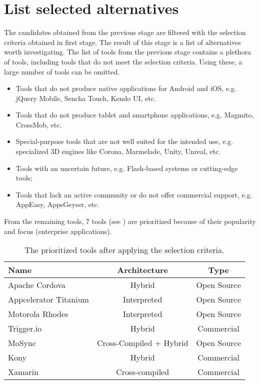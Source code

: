 \section{List selected alternatives}

The candidates obtained from the previous stage are filtered with the selection criteria obtained in first stage. The result of this stage is a list of alternatives worth investigating. The list of tools from the previous stage contains a plethora of tools, including tools that do not meet the selection criteria. Using these, a large number of tools can be omitted.

\begin{itemize}
    \item Tools that do not produce native applications for Android and iOS, e.g. jQuery Mobile, Sencha Touch, Kendo UI, etc.
    \item Tools that do not produce tablet and smartphone applications, e.g. Magmito, CrossMob, etc.
    \item Special-purpose tools that are not well suited for the intended use, e.g. specialized 3D engines like Corona, Marmelade, Unity, Unreal, etc.
    \item Tools with an uncertain future, e.g. Flash-based systems or cutting-edge tools;
    \item Tools that lack an active community or do not offer commercial support, e.g. AppEasy, AppsGeyser, etc. 
\end{itemize}

From the remaining tools, 7 tools (see ) are prioritized because of their popularity and focus (enterprise applications).

\begin{table}[h!]
    \begin{center}
        \begin{tabular}{lcc}
            \hline
            Name                  & Architecture            & Type        \\
            \hline 
            Apache Cordova        & Hybrid                  & Open Source \\
            Appcelerator Titanium & Interpreted             & Open Source \\
            Motorola Rhodes       & Interpreted             & Open Source \\
            Trigger.io            & Hybrid                  & Commercial  \\
            MoSync                & Cross-Compiled + Hybrid & Open Source \\
            Kony                  & Hybrid                  & Commercial  \\
            Xamarin               & Cross-compiled          & Commercial  \\
            \hline
        \end{tabular}
        \caption{The prioritized tools after applying the selection criteria.}
        \label{tab:tools}
    \end{center}
\end{table}

